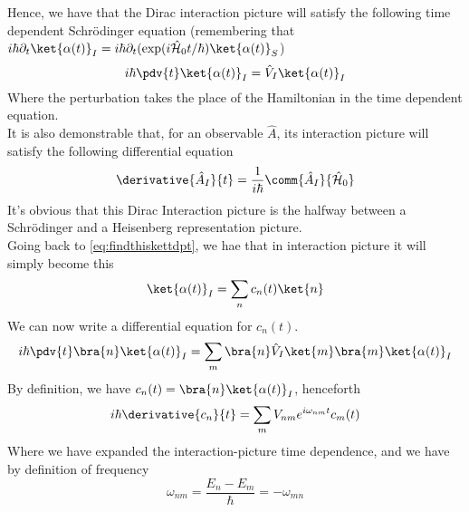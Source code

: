\documentclass[a4paper, 11pt]{book}
\newcommand{\1}{\opr{\mathds{1}}}
\newcommand{\ham}{\mathcal{H}}
\newcommand{\opr}[1]{\hat{#1}}
\theoremstyle{plain}
\begin{document}
	Hence, we have that the Dirac interaction picture will satisfy the following time dependent Schrödinger equation (remembering that $i\hbar\partial_t\ket{\alpha(t)}_I=i\hbar\partial_t(\exp(i\opr{\ham}_0t/\hbar)\ket{\alpha(t)}_S$)
	\begin{equation}
		i\hbar\pdv{t}\ket{\alpha(t)}_I=\opr{V}_I\ket{\alpha(t)}_I
		\label{eq:interactiontdschr}
	\end{equation}
	Where the perturbation takes the place of the Hamiltonian in the time dependent equation.\\
	It is also demonstrable that, for an observable $\opr{A}$, its interaction picture will satisfy the following differential equation
	\begin{equation}
		\derivative{\opr{A}_I}{t}=\frac{1}{i\hbar}\comm{\opr{A}_I}{\opr{\ham}_0}
		\label{eq:intpicobsder}
	\end{equation}
	It's obvious that this Dirac Interaction picture is the halfway between a Schrödinger and a Heisenberg representation picture.\\
	Going back to \eqref{eq:findthiskettdpt}, we hae that in interaction picture it will simply become this
	\begin{equation}
		\ket{\alpha(t)}_I=\sum_nc_n(t)\ket{n}
		\label{eq:intpicbasis}
	\end{equation}
	We can now write a differential equation for $c_n(t)$.
	\begin{equation}
		i\hbar\pdv{t}\bra{n}\ket{\alpha(t)}_I=\sum_m\bra{n}\opr{V}_I\ket{m}\bra{m}\ket{\alpha(t)}_I
		\label{eq:cteqdiff}
	\end{equation}
	By definition, we have $c_n(t)=\bra{n}\ket{\alpha(t)}_I$, henceforth
	\begin{equation}
		i\hbar\derivative{c_n}{t}=\sum_mV_{nm}e^{i\omega_{nm}t}c_m(t)
		\label{eq:ctrealeqdiff}
	\end{equation}
	Where we have expanded the interaction-picture time dependence, and we have by definition of frequency
	\begin{equation}
		\omega_{nm}=\frac{E_n-E_m}{\hbar}=-\omega_{mn}
		\label{eq:omeganmfreq}
	\end{equation}
\end{document}

